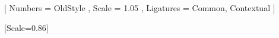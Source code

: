 %
%

\usepackage{fontspec}
\usepackage{unicode-math}

\setmainfont{EB Garamond}[
  Numbers   = OldStyle ,
  Scale     = 1.05 ,
  Ligatures = { Common, Contextual }
]


\setmonofont{Latin Modern Mono}[Scale=0.86]

\usepackage{microtype}               %
\usepackage{graphicx}                %
\usepackage{tikz}                    %
\usepackage{float}                   %


\usepackage{xcolor}

